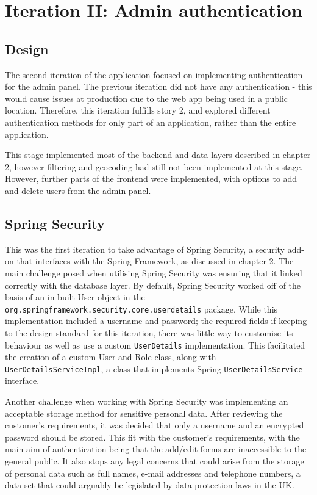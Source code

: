 \section{Iteration II: Admin authentication}
\subsection{Design}

The second iteration of the application focused on implementing authentication for the admin panel. The previous iteration did not have any authentication - this would cause issues at production due to the web app being used in a public location. Therefore, this iteration fulfills story 2, and explored different authentication methods for only part of an application, rather than the entire application.

This stage implemented most of the backend and data layers described in chapter 2, however filtering and geocoding had still not been implemented at this stage. However, further parts of the frontend were implemented, with options to add and delete users from the admin panel.

\subsection{Spring Security}

This was the first iteration to take advantage of Spring Security, a security add-on that interfaces with the Spring Framework, as discussed in chapter 2. The main challenge posed when utilising Spring Security was ensuring that it linked correctly with the database layer. By default, Spring Security worked off of the basis of an in-built User object in the \texttt{org.springframework.security.core.userdetails} package. While this implementation included a username and password; the required fields if keeping to the design standard for this iteration, there was little way to customise its behaviour as well as use a custom \texttt{UserDetails} implementation. This facilitated the creation of a custom User and Role class, along with \texttt{UserDetailsServiceImpl}, a class that implements Spring \texttt{UserDetailsService} interface.

Another challenge when working with Spring Security was implementing an acceptable storage method for sensitive personal data. After reviewing the customer's requirements, it was decided that only a username and an encrypted password should be stored. This fit with the customer's requirements, with the main aim of authentication being that the add/edit forms are inaccessible to the general public. It also stops any legal concerns that could arise from the storage of personal data such as full names, e-mail addresses and telephone numbers, a data set that could arguably be legislated by data protection laws in the UK\cite{dpa2018}.

